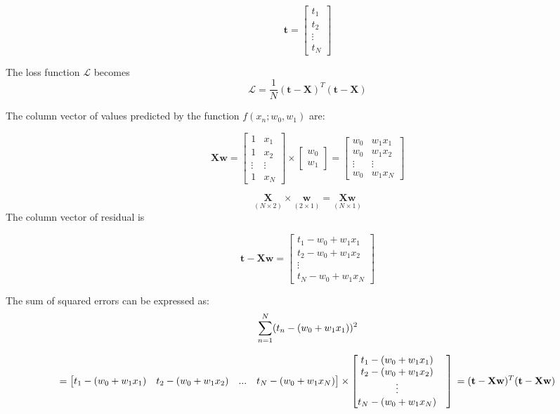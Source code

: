 \documentclass[
]{book}
\begin{document}
\[
\mathbf{t} = 
\begin{bmatrix}
t_{1} \\
t_{2} \\
\vdots \\
t_{N}
\end{bmatrix}
\]

The loss function \(\mathcal{L}\) becomes
\[
\mathcal{L} = 
\frac{1}{N}(\mathbf{t} -\mathbf{X})^T(\mathbf{t} -\mathbf{X})
\]

The column vector of values predicted by the function \(f(x_n; w_0, w_1)\) are:

\[\mathbf{Xw} = 
\begin{bmatrix}
1 & x_{1} \\
1 & x_{2} \\
\vdots & \vdots \\
1 & x_{N}
\end{bmatrix}
\times
\begin{bmatrix}
  w_0 \\ w_1
\end{bmatrix} =
\begin{bmatrix}
  w_0 & w_1x_1 \\
  w_0 & w_1x_2 \\
  \vdots & \vdots \\
  w_0 & w_1x_N 
 \end{bmatrix}
\]

\[
\underset{(N \times 2)}{\mathbf{X}} \times \underset{(2 \times 1)}{\mathbf{w}} =
    \underset{(N \times 1)}{\mathbf{Xw}}
\]
The column vector of residual is

\[
\mathbf{t} - \mathbf{Xw} = 
\begin{bmatrix}
  t_1 - w_0 + w_1x_1 \\
  t_2 - w_0 + w_1x_2 \\
  \vdots \\
  t_N - w_0 + w_1x_N 
 \end{bmatrix}
\]

The sum of squared errors can be expressed as:
\[\sum_{n=1}^{N} (t_n - (w_0 + w_1x_1))^2 \\\]

\[ =
\begin{bmatrix}
  t_1 - (w_0 + w_1x_1) &
  t_2 - (w_0 + w_1x_2) &
  ... &
  t_N - (w_0 + w_1x_N )
\end{bmatrix} 
 \times
\begin{bmatrix}
  t_1 - (w_0 + w_1x_1) & \\
  t_2 - (w_0 + w_1x_2) & \\
  \vdots \\
  t_N - (w_0 + w_1x_N )
\end{bmatrix} \\
= (\mathbf{t} - \mathbf{Xw})^T(\mathbf{t} - \mathbf{Xw})\]
\end{document}
